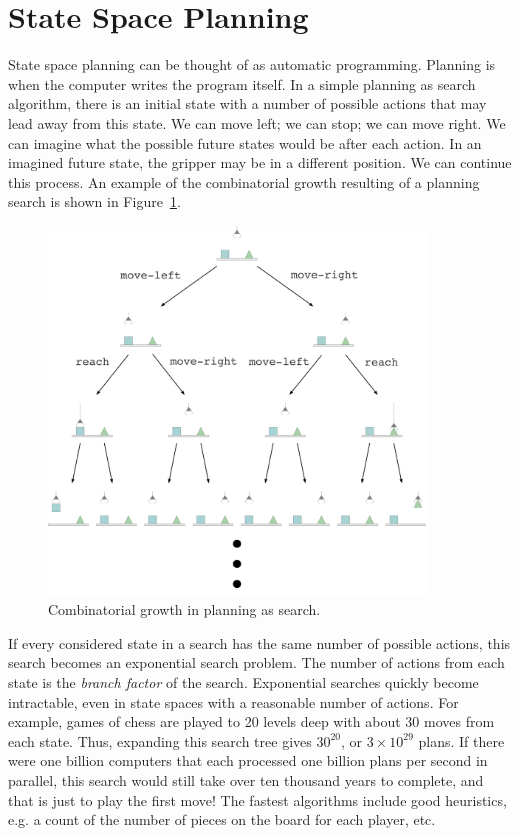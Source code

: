 \section{State Space Planning}

State space planning can be thought of as automatic programming.
Planning is when the computer writes the program itself.  In a simple
planning as search algorithm, there is an initial state with a number
of possible actions that may lead away from this state.  We can move
left; we can stop; we can move right.  We can imagine what the
possible future states would be after each action.  In an imagined
future state, the gripper may be in a different position.  We can
continue this process.  An example of the combinatorial growth
resulting of a planning search is shown in
Figure~\ref{figure:combinatorial_explosion_example}.
\begin{figure}
\center
\includegraphics[width=10cm]{gfx/combinatorial_explosion_example}
\caption{Combinatorial growth in planning as search.}
\label{figure:combinatorial_explosion_example}
\end{figure}

If every considered state in a search has the same number of possible
actions, this search becomes an exponential search problem.  The
number of actions from each state is the \emph{branch factor} of the
search.  Exponential searches quickly become intractable, even in
state spaces with a reasonable number of actions.  For example, games
of chess are played to 20 levels deep with about 30 moves from each
state.  Thus, expanding this search tree gives $30^{20}$, or $3 \times
10^{29}$ plans.  If there were one billion computers that each
processed one billion plans per second in parallel, this search would
still take over ten thousand years to complete, and that is just to
play the first move!  The fastest algorithms include good heuristics,
e.g. a count of the number of pieces on the board for each player,
etc.

